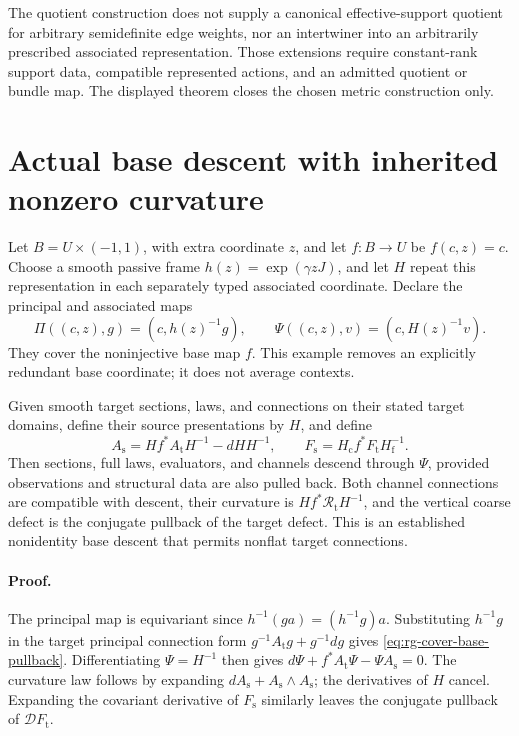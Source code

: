 The quotient construction does not supply a canonical effective-support
quotient for arbitrary semidefinite edge weights, nor an intertwiner into an
arbitrarily prescribed associated representation. Those extensions require
constant-rank support data, compatible represented actions, and an admitted
quotient or bundle map. The displayed theorem closes the chosen metric
construction only. 

\section{Actual base descent with inherited nonzero curvature}
\label{sec:rg-cover-base-descent}

Let \(B=U\times(-1,1)\), with extra coordinate \(z\), and let
\(f:B\to U\) be \(f(c,z)=c\). Choose a smooth passive frame
\(h(z)=\exp(\gamma zJ)\), and let \(H\) repeat this representation in
each separately typed associated coordinate. Declare the principal and
associated maps
\begin{equation}
 \Pi((c,z),g)=(c,h(z)^{-1}g),\qquad
 \Psi((c,z),v)=(c,H(z)^{-1}v).
\label{eq:rg-cover-base-maps}
\end{equation}
They cover the noninjective base map \(f\). This example removes an
explicitly redundant base coordinate; it does not average contexts.

Given smooth target sections, laws, and connections on their stated target
domains, define their source presentations by \(H\), and define
\begin{equation}
 A_{\mathrm s}=Hf^*A_{\mathrm t}H^{-1}-dH H^{-1},\qquad
 F_{\mathrm s}=H_{\mathrm c}f^*F_{\mathrm t}H_{\mathrm f}^{-1}.
\label{eq:rg-cover-base-pullback}
\end{equation}
Then sections, full laws, evaluators, and channels descend through
\(\Psi\), provided observations and structural data are also pulled back.
Both channel connections are compatible with descent, their curvature is
\(Hf^*\mathcal R_{\mathrm t}H^{-1}\), and the vertical coarse defect
is the conjugate pullback of the target defect. This is an established
nonidentity base descent that permits nonflat target connections.

\paragraph{Proof.}
The principal map is equivariant since
\(h^{-1}(ga)=(h^{-1}g)a\). Substituting \(h^{-1}g\) in the target
principal connection form \(g^{-1}A_{\mathrm t}g+g^{-1}dg\) gives
\cref{eq:rg-cover-base-pullback}. Differentiating \(\Psi=H^{-1}\)
then gives \(d\Psi+f^*A_{\mathrm t}\Psi-\Psi A_{\mathrm s}=0\).
The curvature law follows by expanding \(dA_{\mathrm s}+A_{\mathrm s}
\wedge A_{\mathrm s}\); the derivatives of \(H\) cancel. Expanding
the covariant derivative of \(F_{\mathrm s}\) similarly leaves the
conjugate pullback of \(\mathcal D F_{\mathrm t}\).

